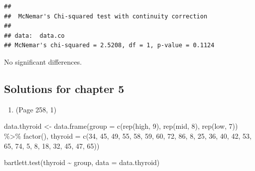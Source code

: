 \documentclass{article}
\newenvironment{Shaded}{\begin{snugshade}}{\end{snugshade}}
\newcommand{\AttributeTok}[1]{\textcolor[rgb]{0.77,0.63,0.00}{#1}}
\newcommand{\DecValTok}[1]{\textcolor[rgb]{0.00,0.00,0.81}{#1}}
\newcommand{\FunctionTok}[1]{\textcolor[rgb]{0.00,0.00,0.00}{#1}}
\newcommand{\NormalTok}[1]{#1}
\newcommand{\OtherTok}[1]{\textcolor[rgb]{0.56,0.35,0.01}{#1}}
\newcommand{\SpecialCharTok}[1]{\textcolor[rgb]{0.00,0.00,0.00}{#1}}
\newcommand{\StringTok}[1]{\textcolor[rgb]{0.31,0.60,0.02}{#1}}
\begin{document}
\begin{verbatim}
## 
##  McNemar's Chi-squared test with continuity correction
## 
## data:  data.co
## McNemar's chi-squared = 2.5208, df = 1, p-value = 0.1124
\end{verbatim}

No significant differences.

\hypertarget{solutions-for-chapter-5}{%
\subsection{Solutions for chapter 5}\label{solutions-for-chapter-5}}

\begin{enumerate}
\def\labelenumi{\arabic{enumi}.}
\tightlist
\item
  (Page 258, 1)
\end{enumerate}

\begin{Shaded}
\begin{Highlighting}[]
\NormalTok{data.thyroid }\OtherTok{\textless{}{-}} \FunctionTok{data.frame}\NormalTok{(}\AttributeTok{group =} \FunctionTok{c}\NormalTok{(}\FunctionTok{rep}\NormalTok{(}\StringTok{\textquotesingle{}high\textquotesingle{}}\NormalTok{, }\DecValTok{9}\NormalTok{), }\FunctionTok{rep}\NormalTok{(}\StringTok{\textquotesingle{}mid\textquotesingle{}}\NormalTok{, }\DecValTok{8}\NormalTok{), }\FunctionTok{rep}\NormalTok{(}\StringTok{\textquotesingle{}low\textquotesingle{}}\NormalTok{, }\DecValTok{7}\NormalTok{)) }\SpecialCharTok{\%\textgreater{}\%} \FunctionTok{factor}\NormalTok{(), }
                           \AttributeTok{thyroid =} \FunctionTok{c}\NormalTok{(}\DecValTok{34}\NormalTok{, }\DecValTok{45}\NormalTok{, }\DecValTok{49}\NormalTok{, }\DecValTok{55}\NormalTok{, }\DecValTok{58}\NormalTok{, }\DecValTok{59}\NormalTok{, }\DecValTok{60}\NormalTok{, }\DecValTok{72}\NormalTok{, }\DecValTok{86}\NormalTok{, }\DecValTok{8}\NormalTok{, }\DecValTok{25}\NormalTok{, }\DecValTok{36}\NormalTok{, }
                                       \DecValTok{40}\NormalTok{, }\DecValTok{42}\NormalTok{, }\DecValTok{53}\NormalTok{, }\DecValTok{65}\NormalTok{, }\DecValTok{74}\NormalTok{, }\DecValTok{5}\NormalTok{, }\DecValTok{8}\NormalTok{, }\DecValTok{18}\NormalTok{, }\DecValTok{32}\NormalTok{, }\DecValTok{45}\NormalTok{, }\DecValTok{47}\NormalTok{, }\DecValTok{65}\NormalTok{))}

\FunctionTok{bartlett.test}\NormalTok{(thyroid }\SpecialCharTok{\textasciitilde{}}\NormalTok{ group, }\AttributeTok{data =}\NormalTok{ data.thyroid)}
\end{Highlighting}
\end{Shaded}
\end{document}
